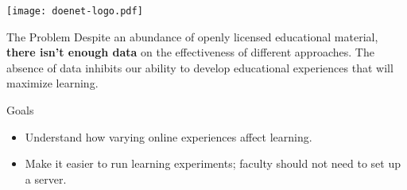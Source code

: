 \vspace{-1.5in}
\texttt{[image: doenet-logo.pdf]}

\begin{sectionblock}{The Problem}
  Despite an abundance of openly licensed educational material,
  \textbf{there isn't enough data} on the effectiveness of different
  approaches.  The absence of data inhibits our ability to develop
  educational experiences that will maximize learning.
\end{sectionblock}

\begin{sectionblock}{Goals}
  \begin{itemize}
  \item Understand how varying online experiences affect learning.
  \item Make it easier to run learning experiments; faculty should not need to set up a server.
  \end{itemize}
\end{sectionblock}
  






